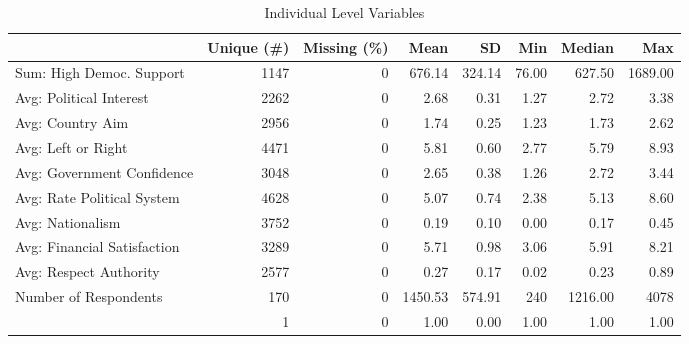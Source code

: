 \begin{table}

\caption{\label{tab:}Individual Level Variables}
\centering
\begin{tabular}[t]{lrrrrrrr}
\toprule
  & Unique (\#) & Missing (\%) & Mean & SD & Min & Median & Max\\
\midrule
Sum: High Democ. Support & 1147 & 0 & 676.14 & 324.14 & 76.00 & 627.50 & 1689.00\\
Avg: Political Interest & 2262 & 0 & 2.68 & 0.31 & 1.27 & 2.72 & 3.38\\
Avg: Country Aim & 2956 & 0 & 1.74 & 0.25 & 1.23 & 1.73 & 2.62\\
Avg: Left or Right & 4471 & 0 & 5.81 & 0.60 & 2.77 & 5.79 & 8.93\\
Avg: Government Confidence & 3048 & 0 & 2.65 & 0.38 & 1.26 & 2.72 & 3.44\\
Avg: Rate Political System & 4628 & 0 & 5.07 & 0.74 & 2.38 & 5.13 & 8.60\\
Avg: Nationalism & 3752 & 0 & 0.19 & 0.10 & 0.00 & 0.17 & 0.45\\
Avg: Financial Satisfaction & 3289 & 0 & 5.71 & 0.98 & 3.06 & 5.91 & 8.21\\
Avg: Respect Authority & 2577 & 0 & 0.27 & 0.17 & 0.02 & 0.23 & 0.89\\
Number of Respondents & 170 & 0 & 1450.53 & 574.91 & 240 & 1216.00 & 4078\\
 & 1 & 0 & 1.00 & 0.00 & 1.00 & 1.00 & 1.00\\
\bottomrule
\end{tabular}
\end{table}
